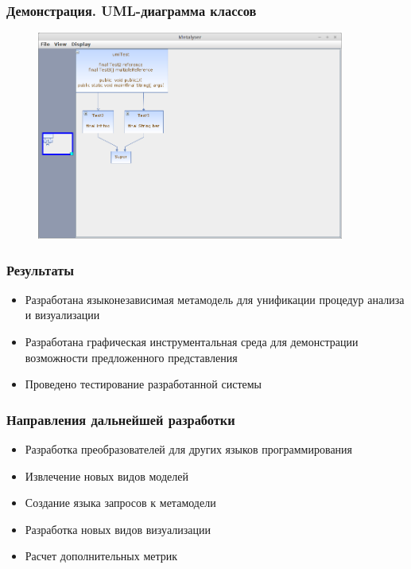 \documentclass{beamer}
\begin{document}
\begin{frame}
\frametitle{Демонстрация. UML-диаграмма классов}

\begin{figure}[h]
    \begin{center}
        \includegraphics[width=0.9\textwidth]{fig/umlTest.png}
    \end{center}
\end{figure}

\end{frame}
\begin{frame}
\frametitle{Результаты}

\begin{itemize}
    \item Разработана языконезависимая метамодель для унификации процедур анализа
    и визуализации
    \item Разработана графическая инструментальная среда для демонстрации
    возможности предложенного представления
    \item Проведено тестирование разработанной системы
\end{itemize}

\end{frame}
\begin{frame}
\frametitle{Направления дальнейшей разработки}

\begin{itemize}
    \item Разработка преобразователей для других языков программирования
    \item Извлечение новых видов моделей
    \item Создание языка запросов к метамодели
    \item Разработка новых видов визуализации
    \item Расчет дополнительных метрик
\end{itemize}

\end{frame}
\end{document}
